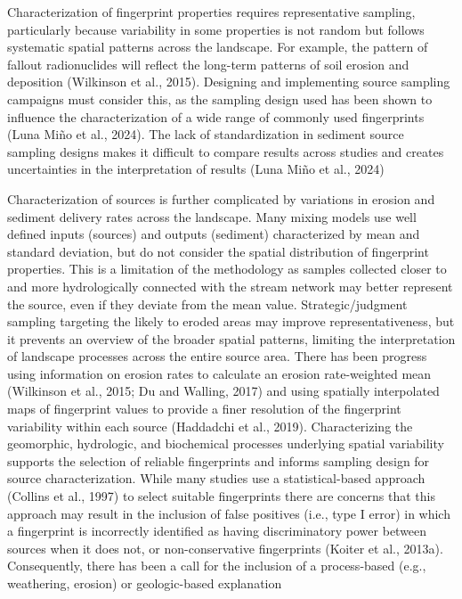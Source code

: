 \documentclass[
  number]{elsarticle}
\begin{document}
Characterization of fingerprint properties requires representative
sampling, particularly because variability in some properties is not
random but follows systematic spatial patterns across the landscape. For
example, the pattern of fallout radionuclides will reflect the long-term
patterns of soil erosion and deposition (Wilkinson et al., 2015).
Designing and implementing source sampling campaigns must consider this,
as the sampling design used has been shown to influence the
characterization of a wide range of commonly used fingerprints (Luna
Miño et al., 2024). The lack of standardization in sediment source
sampling designs makes it difficult to compare results across studies
and creates uncertainties in the interpretation of results (Luna Miño et
al., 2024)

Characterization of sources is further complicated by variations in
erosion and sediment delivery rates across the landscape. Many mixing
models use well defined inputs (sources) and outputs (sediment)
characterized by mean and standard deviation, but do not consider the
spatial distribution of fingerprint properties. This is a limitation of
the methodology as samples collected closer to and more hydrologically
connected with the stream network may better represent the source, even
if they deviate from the mean value. Strategic/judgment sampling
targeting the likely to eroded areas may improve representativeness, but
it prevents an overview of the broader spatial patterns, limiting the
interpretation of landscape processes across the entire source area.
There has been progress using information on erosion rates to calculate
an erosion rate-weighted mean (Wilkinson et al., 2015; Du and Walling,
2017) and using spatially interpolated maps of fingerprint values to
provide a finer resolution of the fingerprint variability within each
source (Haddadchi et al., 2019). Characterizing the geomorphic,
hydrologic, and biochemical processes underlying spatial variability
supports the selection of reliable fingerprints and informs sampling
design for source characterization. While many studies use a
statistical-based approach (Collins et al., 1997) to select suitable
fingerprints there are concerns that this approach may result in the
inclusion of false positives (i.e., type I error) in which a fingerprint
is incorrectly identified as having discriminatory power between sources
when it does not, or non-conservative fingerprints (Koiter et al.,
2013a). Consequently, there has been a call for the inclusion of a
process-based (e.g., weathering, erosion) or geologic-based explanation
\end{document}
